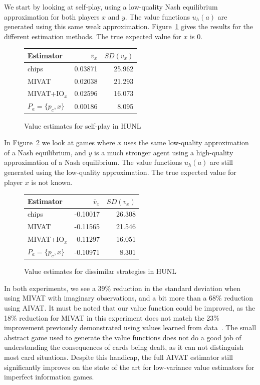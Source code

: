 \documentclass[letterpaper]{article}
\def\VAT{AIVAT}
\begin{document}
We start by looking at self-play, using a low-quality Nash equilibrium
approximation for both players $x$ and $y$. The value functions
$u_h(a)$ are generated using this same weak
approximation. Figure~\ref{fig:texas_selfplay} gives the results for
the different estimation methods. The true expected value for $x$ is
0.

\begin{figure}[!ht]
\centering
\begin{tabular}{|l||r|r|}
\hline
Estimator & $\bar{v}_x$ & $SD(v_x)$ \\
\hline
chips & 0.03871 & 25.962 \\
MIVAT & 0.02038 & 21.293 \\
MIVAT+IO$_x$ & 0.02596 & 16.073 \\
$P_a=\{p_c, x\}$ & 0.00186 & 8.095 \\
\hline
\end{tabular}
\caption{Value estimates for self-play in HUNL}
\label{fig:texas_selfplay}
\end{figure}

In Figure~\ref{fig:texas_asymm} we look at games where $x$ uses the
same low-quality approximation of a Nash equilibrium, and $y$ is a
much stronger agent using a high-quality approximation of a Nash
equilibrium. The value functions $u_h(a)$ are still generated using
the low-quality approximation. The true expected value for player $x$
is not known.

\begin{figure}[!ht]
\centering
\begin{tabular}{|l||r|r|}
\hline
Estimator & $\bar{v}_x$ & $SD(v_x)$ \\
\hline
chips & -0.10017 & 26.308 \\
MIVAT & -0.11565 & 21.546 \\
MIVAT+IO$_x$ & -0.11297 & 16.051 \\
$P_a=\{p_c, x\}$ & -0.10971 & 8.301 \\
\hline
\end{tabular}
\caption{Value estimates for dissimilar strategies in HUNL}
\label{fig:texas_asymm}
\end{figure}

In both experiments, we see a 39\% reduction in the standard deviation
when using MIVAT with imaginary observations, and a bit more than a
68\% reduction using \VAT{}. It must be noted that our value function
could be improved, as the 18\% reduction for MIVAT in this experiment
does not match the 23\% improvement previously demonstrated using
values learned from data~\cite{09white-mivat}. The small abstract game
used to generate the value functions does not do a good job of
understanding the consequences of cards being dealt, as it can not
distinguish most card situations. Despite this handicap, the
full \VAT{} estimator still significantly improves on the state of the
art for low-variance value estimators for imperfect information games.
\end{document}
